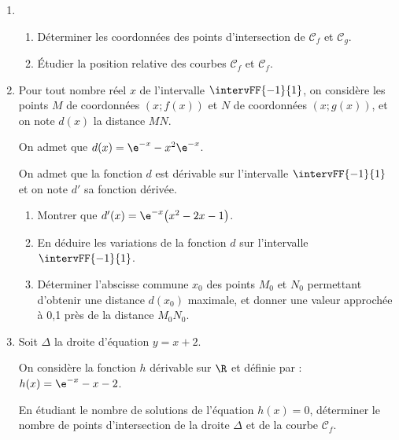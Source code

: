 \begin{enumerate}
	\item 
	\begin{enumerate}
		\item Déterminer les coordonnées des points d’intersection de $\mathcal{C}_f$ et $\mathcal{C}_g$.
		\item Étudier la position relative des courbes $\mathcal{C}_f$ et $\mathcal{C}_f$.
	\end{enumerate}
	\item Pour tout nombre réel $x$ de l’intervalle $\intervFF{-1}{1}$, on considère les points $M$ de coordonnées $(x;f(x))$ et $N$ de coordonnées $(x;g(x))$, et on note $d(x)$ la distance $MN$.
	
	On admet que $d(x)=\e^{-x}-x^2\e^{-x}$.
	
	\smallskip
	
	On admet que la fonction $d$ est dérivable sur l’intervalle $\intervFF{-1}{1}$ et on note $d'$ sa fonction dérivée.
	\begin{enumerate}
		\item Montrer que $d'(x)=\e^{-x} \big(x^2-2x-1\big)$.
		\item En déduire les variations de la fonction $d$ sur l’intervalle $\intervFF{-1}{1}$. 
		\item Déterminer l’abscisse commune $x_0$ des points $M_0$ et $N_0$ permettant d’obtenir une distance $d(x_0)$ maximale, et donner une valeur approchée à 0,1 près de la distance $M_0N_0$.
	\end{enumerate}
	\item Soit $\Delta$ la droite d’équation $y=x+2$.
	
	On considère la fonction $h$ dérivable sur $\R$ et définie par : $h(x)=\e^{-x}-x-2$.
	
	En étudiant le nombre de solutions de l’équation $h(x)=0$, déterminer le nombre de points d’intersection de la droite $\Delta$ et de la courbe $\mathcal{C}_f$.
\end{enumerate}

